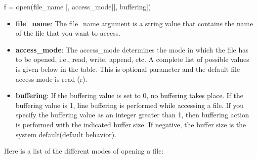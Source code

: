 \documentclass[11pt]{article}
\providecommand{\tightlist}{%
      \setlength{\itemsep}{0pt}\setlength{\parskip}{0pt}}
\newenvironment{Shaded}{}{}
\newcommand{\NormalTok}[1]{{#1}}
\newcommand{\OperatorTok}[1]{\textcolor[rgb]{0.40,0.40,0.40}{{#1}}}
\newcommand{\BuiltInTok}[1]{{#1}}
\begin{document}
\begin{Shaded}
\begin{Highlighting}[]
\NormalTok{f }\OperatorTok{=} \BuiltInTok{open}\NormalTok{(file_name [, access_mode][, buffering])}
\end{Highlighting}
\end{Shaded}

\begin{itemize}
\tightlist
\item
  \textbf{file\_name}: The file\_name argument is a string value that
  contains the name of the file that you want to access.
\item
  \textbf{access\_mode}: The access\_mode determines the mode in which
  the file has to be opened, i.e., read, write, append, etc. A complete
  list of possible values is given below in the table. This is optional
  parameter and the default file access mode is read (r).
\item
  \textbf{buffering}: If the buffering value is set to 0, no buffering
  takes place. If the buffering value is 1, line buffering is performed
  while accessing a file. If you specify the buffering value as an
  integer greater than 1, then buffering action is performed with the
  indicated buffer size. If negative, the buffer size is the system
  default(default behavior).
\end{itemize}

Here is a list of the different modes of opening a file:
\end{document}
